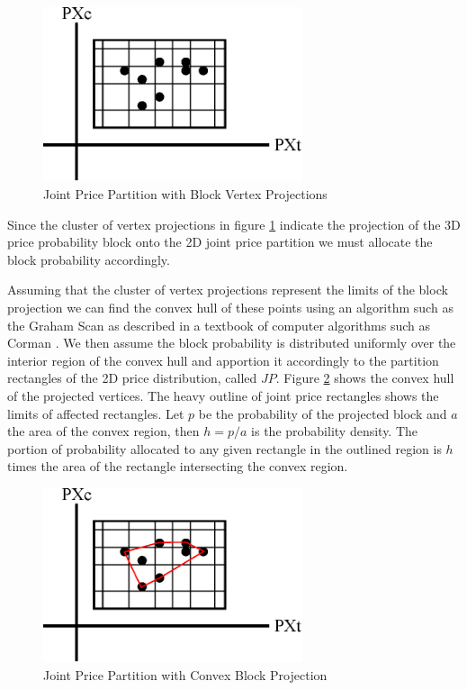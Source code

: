 \begin{figure}
  \centering
  \includegraphics[width=3in]{Images/ptc_rectangle}
  \caption[Joint Price Partition with Block Vertex Projections]
          {Joint Price Partition with Block Vertex Projections}
  \label{fig:ptc_rectangle}
\end{figure}

Since the cluster of vertex projections in figure
\ref{fig:ptc_rectangle} indicate the projection of the 3D price
probability block onto the 2D joint price partition we must allocate
the block probability accordingly. 

Assuming that the cluster of vertex projections represent the limits
of the block projection we can find the convex hull of these points
using an algorithm such as the Graham 
Scan as described in a textbook of computer algorithms such as Corman
\cite{corman09}. We then assume the block probability is distributed
uniformly over the interior region of the convex hull and apportion it
accordingly to the partition rectangles of the 2D price
distribution, called $JP$. Figure \ref{fig:ptc_rectangle_convex} shows the convex
hull of the projected vertices. The heavy outline of joint price
rectangles shows the limits of affected rectangles. Let $p$ be the
probability of the projected block and $a$ the area of the convex
region, then $h = p/a$ is the probability density. The portion of
probability allocated to any given rectangle in the outlined region is
$h$ times the area of the rectangle intersecting the convex region.

\begin{figure}
  \centering
  \includegraphics[width=3in]{Images/ptc_rectangle_convex}
  \caption[Joint Price Partition with Convex Block Projection]
          {Joint Price Partition with Convex Block Projection}
  \label{fig:ptc_rectangle_convex}
\end{figure}

